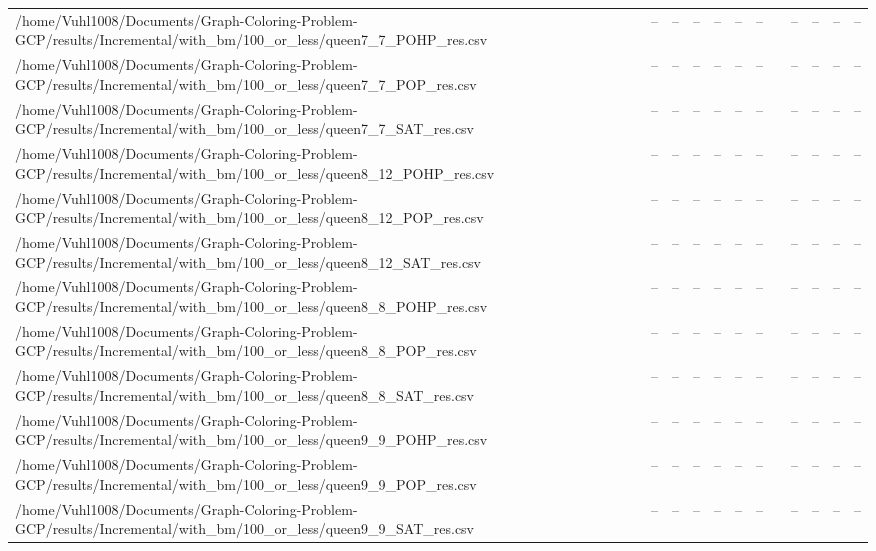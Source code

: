 \begin{table}[htbp]
\begin{tabular}{llllllllllll}
/home/Vuhl1008/Documents/Graph-Coloring-Problem-GCP/results/Incremental/with\_bm/100\_or\_less/queen7\_7\_POHP\_res.csv & -- & -- & -- & -- & -- & -- & {} & -- & -- & -- & -- \\
/home/Vuhl1008/Documents/Graph-Coloring-Problem-GCP/results/Incremental/with\_bm/100\_or\_less/queen7\_7\_POP\_res.csv & -- & -- & -- & -- & -- & -- & {} & -- & -- & -- & -- \\
/home/Vuhl1008/Documents/Graph-Coloring-Problem-GCP/results/Incremental/with\_bm/100\_or\_less/queen7\_7\_SAT\_res.csv & -- & -- & -- & -- & -- & -- & {} & -- & -- & -- & -- \\
/home/Vuhl1008/Documents/Graph-Coloring-Problem-GCP/results/Incremental/with\_bm/100\_or\_less/queen8\_12\_POHP\_res.csv & -- & -- & -- & -- & -- & -- & {} & -- & -- & -- & -- \\
/home/Vuhl1008/Documents/Graph-Coloring-Problem-GCP/results/Incremental/with\_bm/100\_or\_less/queen8\_12\_POP\_res.csv & -- & -- & -- & -- & -- & -- & {} & -- & -- & -- & -- \\
/home/Vuhl1008/Documents/Graph-Coloring-Problem-GCP/results/Incremental/with\_bm/100\_or\_less/queen8\_12\_SAT\_res.csv & -- & -- & -- & -- & -- & -- & {} & -- & -- & -- & -- \\
/home/Vuhl1008/Documents/Graph-Coloring-Problem-GCP/results/Incremental/with\_bm/100\_or\_less/queen8\_8\_POHP\_res.csv & -- & -- & -- & -- & -- & -- & {} & -- & -- & -- & -- \\
/home/Vuhl1008/Documents/Graph-Coloring-Problem-GCP/results/Incremental/with\_bm/100\_or\_less/queen8\_8\_POP\_res.csv & -- & -- & -- & -- & -- & -- & {} & -- & -- & -- & -- \\
/home/Vuhl1008/Documents/Graph-Coloring-Problem-GCP/results/Incremental/with\_bm/100\_or\_less/queen8\_8\_SAT\_res.csv & -- & -- & -- & -- & -- & -- & {} & -- & -- & -- & -- \\
/home/Vuhl1008/Documents/Graph-Coloring-Problem-GCP/results/Incremental/with\_bm/100\_or\_less/queen9\_9\_POHP\_res.csv & -- & -- & -- & -- & -- & -- & {} & -- & -- & -- & -- \\
/home/Vuhl1008/Documents/Graph-Coloring-Problem-GCP/results/Incremental/with\_bm/100\_or\_less/queen9\_9\_POP\_res.csv & -- & -- & -- & -- & -- & -- & {} & -- & -- & -- & -- \\
/home/Vuhl1008/Documents/Graph-Coloring-Problem-GCP/results/Incremental/with\_bm/100\_or\_less/queen9\_9\_SAT\_res.csv & -- & -- & -- & -- & -- & -- & {} & -- & -- & -- & -- \\

\end{tabular}
\end{table}
